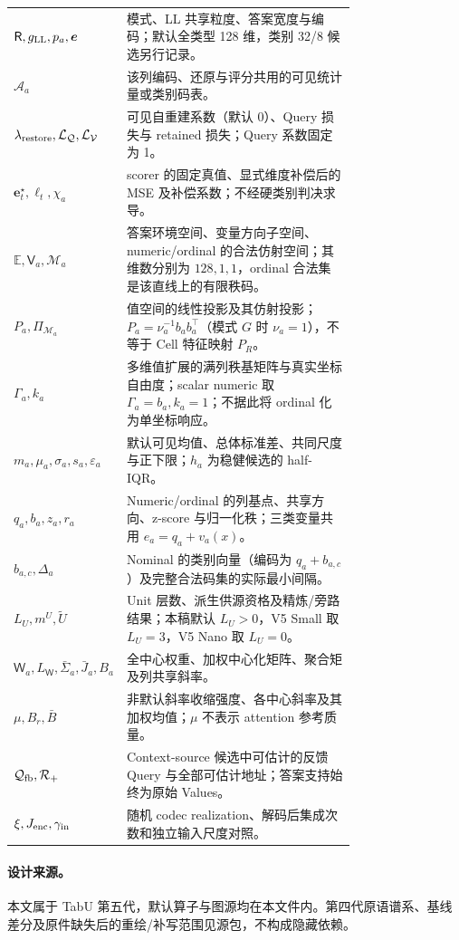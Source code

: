 \documentclass[11pt,UTF8,fontset=fandol]{ctexart}
\numberwithin{equation}{section}
\theoremstyle{definition}
\newcommand{\Vset}{\mathcal V}
\newcommand{\Qset}{\mathcal Q}
\begin{document}
\begin{longtable}{l p{0.75\linewidth}}
$\mathsf R,g_{\rm LL},p_a,\bm e$ & 模式、LL 共享粒度、答案宽度与编码；默认全类型 128 维，类别 32/8 候选另行记录。\\
$\mathcal A_a$ & 该列编码、还原与评分共用的可见统计量或类别码表。\\
$\lambda_{\rm restore},\mathcal L_{\Qset},\mathcal L_{\Vset}$ & 可见自重建系数（默认 0）、Query 损失与 retained 损失；Query 系数固定为 1。\\
$\bm e_t^\star,\ell_t,\chi_a$ & scorer 的固定真值、显式维度补偿后的 MSE 及补偿系数；不经硬类别判决求导。\\
$\mathbb E,\mathsf V_a,\mathcal M_a$ & 答案环境空间、变量方向子空间、numeric/ordinal 的合法仿射空间；其维数分别为 $128,1,1$，ordinal 合法集是该直线上的有限秩码。\\
$P_a,\Pi_{\mathcal M_a}$ & 值空间的线性投影及其仿射投影；$P_a=\nu_a^{-1}b_ab_a^\top$（模式 $G$ 时 $\nu_a=1$），不等于 Cell 特征映射 $P_R$。\\
$\Gamma_a,k_a$ & 多维值扩展的满列秩基矩阵与真实坐标自由度；scalar numeric 取 $\Gamma_a=b_a,k_a=1$；不据此将 ordinal 化为单坐标响应。\\
$m_a,\mu_a,\sigma_a,s_a,\varepsilon_a$ & 默认可见均值、总体标准差、共同尺度与正下限；$h_a$ 为稳健候选的 half-IQR。\\
$q_a,b_a,z_a,r_a$ & Numeric/ordinal 的列基点、共享方向、z-score 与归一化秩；三类变量共用 $e_a=q_a+v_a(x)$。\\
$b_{a,c},\Delta_a$ & Nominal 的类别向量（编码为 $q_a+b_{a,c}$）及完整合法码集的实际最小间隔。\\
$L_U,m^U,\widetilde U$ & Unit 层数、派生供源资格及精炼/旁路结果；本稿默认 $L_U>0$，V5 Small 取 $L_U=3$，V5 Nano 取 $L_U=0$。\\
$\mathsf W_a,L_{\mathsf W},\bar\Sigma_a,\bar J_a,B_a$ & 全中心权重、加权中心化矩阵、聚合矩及列共享斜率。\\
$\mu,B_r,\bar B$ & 非默认斜率收缩强度、各中心斜率及其加权均值；$\mu$ 不表示 attention 参考质量。\\
$\mathcal Q_{\rm fb},\mathcal R_+$ & Context-source 候选中可估计的反馈 Query 与全部可估计地址；答案支持始终为原始 Values。\\
$\xi,J_{\rm enc},\gamma_{\rm in}$ & 随机 codec realization、解码后集成次数和独立输入尺度对照。\\
\bottomrule
\end{longtable}

\endgroup

\paragraph{设计来源。}
本文属于 TabU 第五代，默认算子与图源均在本文件内。第四代原语谱系、基线差分及原件缺失后的重绘/补写范围见源包，不构成隐藏依赖。
\end{document}
